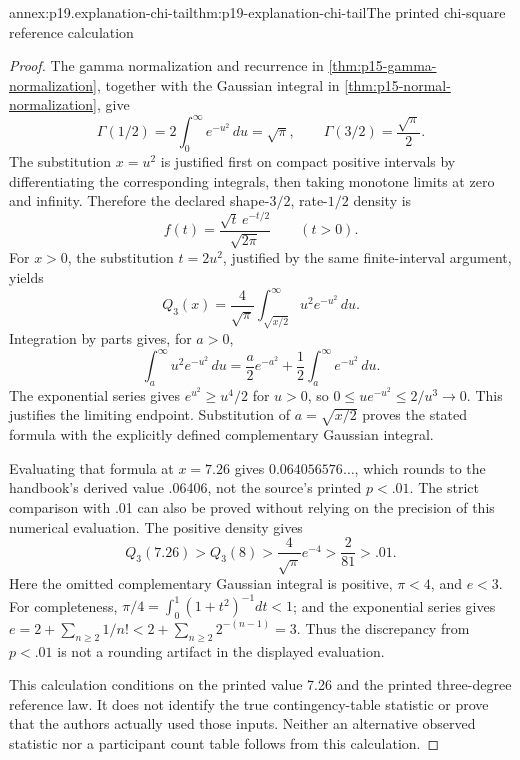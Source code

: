 \begin{annexitem}{annex:p19.explanation-chi-tail}{thm:p19-explanation-chi-tail}{The printed chi-square reference calculation}
\begin{proof}
The gamma normalization and recurrence in
\cref{thm:p15-gamma-normalization}, together with the
Gaussian integral in \cref{thm:p15-normal-normalization},
give
\[
 \Gamma(1/2)=2\int_0^\infty e^{-u^2}\,du=\sqrt\pi,
 \qquad \Gamma(3/2)=\frac{\sqrt\pi}{2}.
\]
The substitution \(x=u^2\) is justified first on compact
positive intervals by differentiating the corresponding
integrals, then taking monotone limits at zero and infinity.
Therefore the declared shape-\(3/2\), rate-\(1/2\)
density is
\[
 f(t)=\frac{\sqrt t\,e^{-t/2}}{\sqrt{2\pi}}
 \qquad(t>0).
\]
For \(x>0\), the substitution \(t=2u^2\), justified by
the same finite-interval argument, yields
\[
 Q_3(x)=\frac4{\sqrt\pi}
             \int_{\sqrt{x/2}}^\infty u^2e^{-u^2}\,du.
\]
Integration by parts gives, for \(a>0\),
\[
 \int_a^\infty u^2e^{-u^2}\,du
 =\frac a2 e^{-a^2}
       +\frac12\int_a^\infty e^{-u^2}\,du.
\]
The exponential series gives \(e^{u^2}\geq u^4/2\) for
\(u>0\), so \(0\leq u e^{-u^2}\leq2/u^3\to0\).
This justifies the limiting endpoint.
Substitution of \(a=\sqrt{x/2}\) proves the stated
formula with the explicitly defined complementary
Gaussian integral.

Evaluating that formula at \(x=7.26\) gives
\(0.064056576\ldots\), which rounds to the handbook's
derived value .06406, not the source's printed \(p<.01\).
The strict comparison with .01 can also be proved
without relying on the precision of this numerical
evaluation. The positive density gives
\[
 Q_3(7.26)>Q_3(8)>
 \frac4{\sqrt\pi}e^{-4}>
 \frac2{81}>.01.
\]
Here the omitted complementary Gaussian integral is
positive, \(\pi<4\), and \(e<3\).
For completeness, \(\pi/4=\int_0^1(1+t^2)^{-1}dt<1\);
and the exponential series gives
\(e=2+\sum_{n\geq2}1/n!<2+\sum_{n\geq2}2^{-(n-1)}=3\).
Thus the discrepancy from \(p<.01\) is not a rounding
artifact in the displayed evaluation.

This calculation conditions on the printed value 7.26
and the printed three-degree reference law. It does not
identify the true contingency-table statistic or prove
that the authors actually used those inputs.
Neither an alternative observed statistic nor a participant
count table follows from this calculation.
\end{proof}
\end{annexitem}
